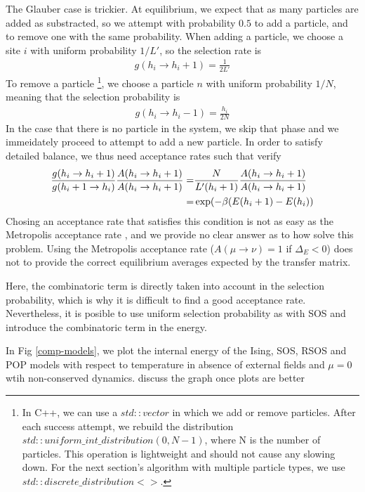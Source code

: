 The Glauber case is trickier. At equilibrium, we expect that as many particles are added as substracted, so we attempt with probability $0.5$ to add a particle, and to remove one with the same probability. When adding a particle, we choose a site $i$ with uniform probability $1/L'$, so the selection rate is 
\begin{align}
    g(h_i \to h_i+1) = \frac{1}{2L'}
\end{align}
To remove a particle \footnote{In C++, we can use a $std::vector$ in which we add or remove particles. After each success attempt, we rebuild the distribution $std::uniform\_int\_distribution(0,N-1)$, where N is the number of particles. This operation is lightweight and should not cause any slowing down. For the next section's algorithm with multiple particle types, we use $std::discrete\_distribution<>$. }, we choose a particle $n$ with uniform probability $1/N$, meaning that the selection probability is 
\begin{align}
    g(h_i \to h_i-1) = \frac{h_i}{2N}
\end{align}
In the case that there is no particle in the system, we skip that phase and we immeidately proceed to attempt to add a new particle.
In order to satisfy detailed balance, we thus need acceptance rates such that verify
\begin{align}
    \frac{g(h_i \to h_i+1)}{g(h_i+1 \to h_i)} \frac{A(h_i \to h_i+1)}{A(h_i \to h_i+1)}
    =& \frac{N}{L' (h_i+1)} \frac{A(h_i \to h_i+1)}{A(h_i \to h_i+1)} \nonumber \\
     =& \exp(-\beta (E(h_i+1)-E(h_i)) 
\end{align}
Chosing an acceptance rate that satisfies this condition is not as easy as the Metropolis acceptance rate \cite{metropolis_monte_1949}, and we provide no clear answer as to how solve this problem. Using the Metropolis acceptance rate ($A(\mu \to \nu) = 1$ if $\Delta_E < 0$) does not to provide the correct equilibrium averages expected by the transfer matrix.

Here, the combinatoric term is directly taken into account in the selection probability, which is why it is difficult to find a good acceptance rate. Nevertheless, it is posible to use uniform selection probability as with SOS and introduce the combinatoric term in the energy. 
 
In Fig \ref{comp-models}, we plot the internal energy of the Ising, SOS, RSOS and POP models with respect to temperature in absence of external fields and $\mu=0$ wtih non-conserved dynamics. {\color{red} discuss the graph once plots are better}


